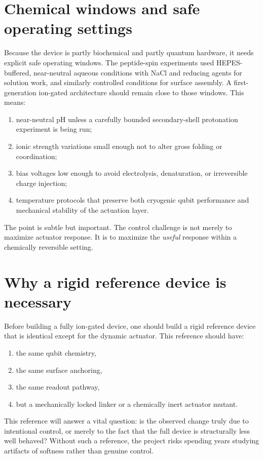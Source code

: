 \documentclass[11pt]{report}
\theoremstyle{definition}
\begin{document}
\section{Chemical windows and safe operating settings}
Because the device is partly biochemical and partly quantum hardware, it needs explicit safe operating windows. The peptide-spin experiments used HEPES-buffered, near-neutral aqueous conditions with NaCl and reducing agents for solution work, and similarly controlled conditions for surface assembly. A first-generation ion-gated architecture should remain close to those windows. This means:

\begin{enumerate}[leftmargin=2em]
\item near-neutral pH unless a carefully bounded secondary-shell protonation experiment is being run;
\item ionic strength variations small enough not to alter gross folding or coordination;
\item bias voltages low enough to avoid electrolysis, denaturation, or irreversible charge injection;
\item temperature protocols that preserve both cryogenic qubit performance and mechanical stability of the actuation layer.
\end{enumerate}

The point is subtle but important. The control challenge is not merely to maximize actuator response. It is to maximize the \emph{useful} response within a chemically reversible setting.

\section{Why a rigid reference device is necessary}
Before building a fully ion-gated device, one should build a rigid reference device that is identical except for the dynamic actuator. This reference should have:

\begin{enumerate}[leftmargin=2em]
\item the same qubit chemistry,
\item the same surface anchoring,
\item the same readout pathway,
\item but a mechanically locked linker or a chemically inert actuator mutant.
\end{enumerate}

This reference will answer a vital question: is the observed change truly due to intentional control, or merely to the fact that the full device is structurally less well behaved? Without such a reference, the project risks spending years studying artifacts of softness rather than genuine control.
\end{document}
